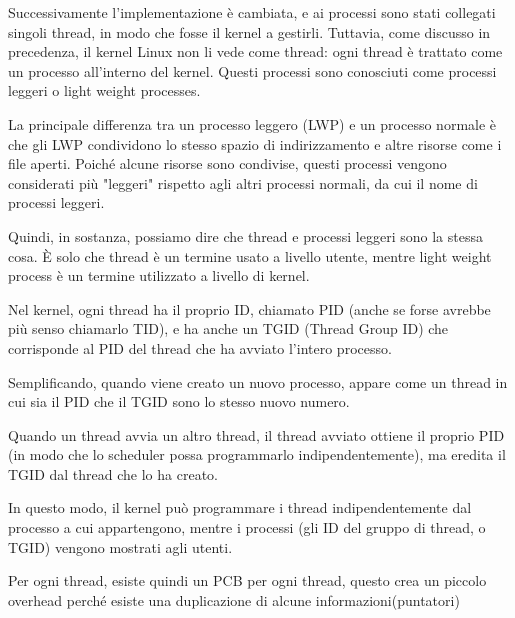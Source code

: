 Successivamente l'implementazione è cambiata, e ai processi sono stati collegati singoli thread, in modo che fosse il kernel a gestirli. Tuttavia, come discusso in precedenza, il kernel Linux non li vede come thread: ogni thread è trattato come un processo all'interno del kernel. Questi processi sono conosciuti come processi leggeri o light weight processes.

La principale differenza tra un processo leggero (LWP) e un processo normale è che gli LWP condividono lo stesso spazio di indirizzamento e altre risorse come i file aperti. Poiché alcune risorse sono condivise, questi processi vengono considerati più "leggeri" rispetto agli altri processi normali, da cui il nome di processi leggeri.

Quindi, in sostanza, possiamo dire che thread e processi leggeri sono la stessa cosa. È solo che thread è un termine usato a livello utente, mentre light weight process è un termine utilizzato a livello di kernel.


Nel kernel, ogni thread ha il proprio ID, chiamato PID (anche se forse avrebbe più senso chiamarlo TID), e ha anche un TGID (Thread Group ID) che corrisponde al PID del thread che ha avviato l'intero processo.

Semplificando, quando viene creato un nuovo processo, appare come un thread in cui sia il PID che il TGID sono lo stesso nuovo numero.

Quando un thread avvia un altro thread, il thread avviato ottiene il proprio PID (in modo che lo scheduler possa programmarlo indipendentemente), ma eredita il TGID dal thread che lo ha creato.

In questo modo, il kernel può programmare i thread indipendentemente dal processo a cui appartengono, mentre i processi (gli ID del gruppo di thread, o TGID) vengono mostrati agli utenti.

Per ogni thread, esiste quindi un PCB per ogni thread, questo crea un piccolo overhead perché esiste una duplicazione di alcune informazioni(puntatori)
